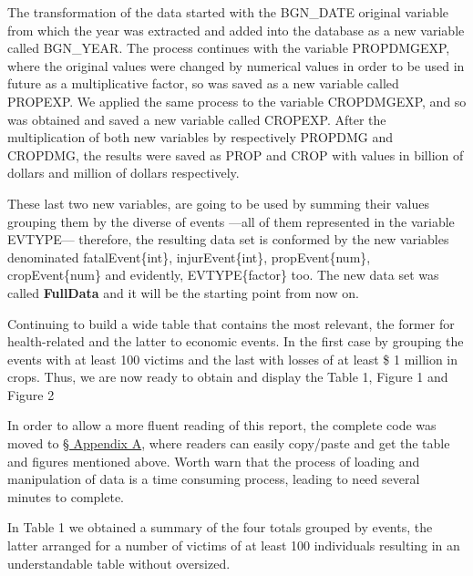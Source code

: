 \documentclass[12pt,spanish, american,b4paper, onecolumn, lmargin=1cm, rmargin=1cm, tmargin=1cm, bmargin=2cm,]{article}
\begin{document}
The transformation of the data started with the BGN\_DATE original
variable from which the year was extracted and added into the database
as a new variable called BGN\_YEAR. The process continues with the
variable PROPDMGEXP, where the original values were changed by numerical
values in order to be used in future as a multiplicative factor, so was
saved as a new variable called PROPEXP. We applied the same process to
the variable CROPDMGEXP, and so was obtained and saved a new variable
called CROPEXP. After the multiplication of both new variables by
respectively PROPDMG and CROPDMG, the results were saved as PROP and
CROP with values in billion of dollars and million of dollars
respectively.

These last two new variables, are going to be used by summing their
values grouping them by the diverse of events ---all of them represented
in the variable EVTYPE--- therefore, the resulting data set is conformed
by the new variables denominated fatalEvent\{int\}, injurEvent\{int\},
propEvent\{num\}, cropEvent\{num\} and evidently, EVTYPE\{factor\} too.
The new data set was called \textbf{FullData} and it will be the
starting point from now on.

Continuing to build a wide table that contains the most relevant, the
former for health-related and the latter to economic events. In the
first case by grouping the events with at least 100 victims and the last
with losses of at least \$ 1 million in crops. Thus, we are now ready to
obtain and display the Table 1, Figure 1 and Figure 2

In order to allow a more fluent reading of this report, the complete
code was moved to \hyperref[appendix-a]{§ Appendix A}, where readers can
easily copy/paste and get the table and figures mentioned above. Worth
warn that the process of loading and manipulation of data is a time
consuming process, leading to need several minutes to complete.


In Table 1 we obtained a summary of the four totals grouped by events,
the latter arranged for a number of victims of at least 100 individuals
resulting in an understandable table without oversized.
\end{document}
